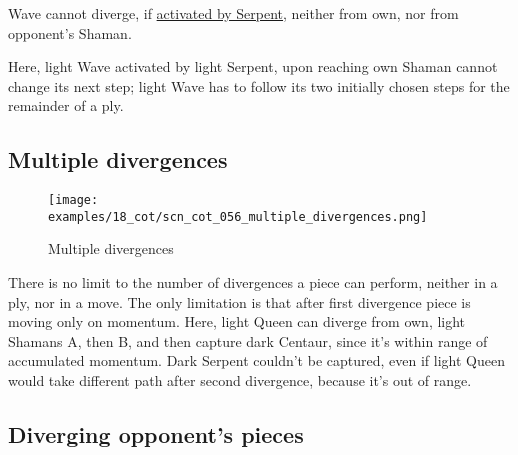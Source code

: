 \vspace*{-0.5\baselineskip}
Wave cannot diverge, if
\hyperref[fig:scn_tr_29_serpent_activating_wave]{activated by Serpent},
neither from own, nor from opponent's Shaman.

Here, light Wave activated by light Serpent, upon reaching own Shaman cannot change
its next step; light Wave has to follow its two initially chosen steps for the
remainder of a ply.

\clearpage %

\subsection*{Multiple divergences}
\label{sec:Conquest of Tlalocan/Divergence/Multiple divergences}

\vspace*{-1.4\baselineskip}
\noindent
\begin{figure}[!h]
\texttt{[image: examples/18\_cot/scn\_cot\_056\_multiple\_divergences.png]}
\vspace*{-1.3\baselineskip}
\caption{Multiple divergences}
\label{fig:scn_cot_056_multiple_divergences}
\end{figure}

\vspace*{-0.5\baselineskip}
There is no limit to the number of divergences a piece can perform, neither in a ply,
nor in a move. The only limitation is that after first divergence piece is moving
only on momentum. \newline
\indent
Here, light Queen can diverge from own, light Shamans A, then B, and then capture
dark Centaur, since it's within range of accumulated momentum. Dark Serpent couldn't
be captured, even if light Queen would take different path after second divergence,
because it's out of range.

\clearpage %

\subsection*{Diverging opponent's pieces}
\label{sec:Conquest of Tlalocan/Divergence/Diverging opponent's pieces}

